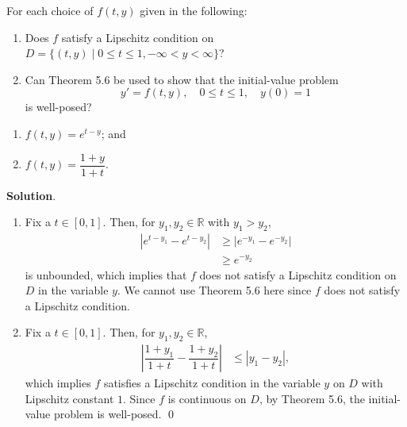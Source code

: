 \documentclass[11pt]{article}
\theoremstyle{break}
\numberwithin{equation}{theorem}
\begin{document}
\newpage
\begin{problem}\label{problem 2} %
    For each choice of $f(t, y)$ given in the following:
    \begin{enumerate}[label=\roman*.]
        \item Does $f$ satisfy a Lipschitz condition on $D=\{(t, y)\mid 0\leq t\leq1, -\infty<y<\infty\}$?
        \item Can Theorem 5.6 be used to show that the initial-value problem $$y'=f(t, y),\quad 0\leq t\leq 1, \quad y(0)=1$$ is well-posed?
    \end{enumerate}
    \begin{enumerate}
        \item $f(t, y)=e^{t-y}$; and
        \item $f(t, y)=\dfrac{1+y}{1+t}$.
    \end{enumerate}
\end{problem}
\textbf{Solution}. 
\begin{enumerate}
    \item Fix a $t\in[0, 1]$. Then, for $y_1, y_2\in\mathbb{R}$ with $y_1>y_2$, \begin{align*}
        \left|e^{t-y_1}-e^{t-y_2}\right|&\geq \left|e^{-y_1}-e^{-y_2}\right|\\
        &\geq e^{-y_2}
    \end{align*}
    is unbounded, which implies that $f$ does not satisfy a Lipschitz condition on $D$ in the variable $y$. We cannot use Theorem 5.6 here since $f$ does not satisfy a Lipschitz condition.
    \item Fix a $t\in[0, 1]$. Then, for $y_1, y_2\in\mathbb{R}$, \begin{align*}
        \left|\dfrac{1+y_1}{1+t}-\dfrac{1+y_2}{1+t}\right|&\leq|y_1-y_2|,
    \end{align*}
    which implies $f$ satisfies a Lipschitz condition in the variable $y$ on $D$ with Lipschitz constant $1$. Since $f$ is continuous on $D$, by Theorem 5.6, the initial-value problem is well-posed. \qed
\end{enumerate}
\end{document}
